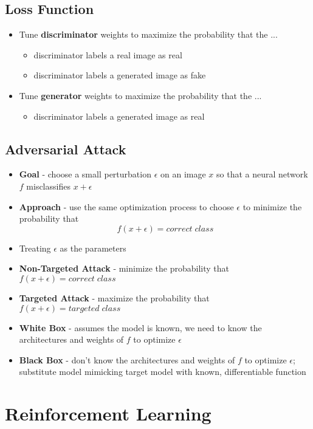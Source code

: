 \documentclass[11pt]{article}
\begin{document}
\subsection{Loss Function}
\begin{itemize}
\item Tune \textbf{discriminator} weights to maximize the probability that the ...
\begin{itemize}
\item discriminator labels a real image as real
\item discriminator labels a generated image as fake
\end{itemize}
\item Tune \textbf{generator} weights to maximize the probability that the ...
\begin{itemize}
\item discriminator labels a generated image as real
\end{itemize}
\end{itemize}

\subsection{Adversarial Attack}
\begin{itemize}
\item \textbf{Goal} - choose a small perturbation $\epsilon$ on an image $x$ so that a neural network $f$ misclassifies $x+ \epsilon$
\item \textbf{Approach} - use the same optimization process to choose $\epsilon$ to minimize the probability that
$$ f(x+ \epsilon ) = correct \; class $$
\item Treating $\epsilon$ as the parameters
\item \textbf{Non-Targeted Attack} - minimize the probability that $ f(x+ \epsilon ) = correct \; class $
\item \textbf{Targeted Attack} - maximize the probability that $ f(x+ \epsilon ) = targeted \; class $
\item \textbf{White Box} - assumes the model is known,  we need to know the architectures and weights of $f$ to optimize $\epsilon$
\item \textbf{Black Box} - don’t know the architectures and weights of $f$ to optimize $\epsilon$; substitute model mimicking target model with known,  differentiable function
\end{itemize}

\pagebreak

\section{Reinforcement Learning}
\end{document}
